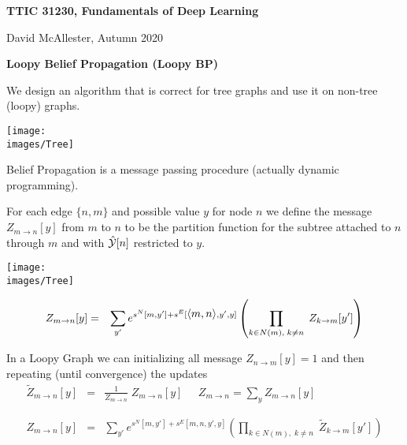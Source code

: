 




{\Huge

  \centerline{\bf TTIC 31230, Fundamentals of Deep Learning}
  \bigskip
  \centerline{David McAllester, Autumn 2020}
  \vfill
  \vfill
  \centerline{\bf Loopy Belief Propagation (Loopy BP)}
\vfill
\vfill
\vfill


We design an algorithm that is correct for tree graphs and use it on non-tree (loopy) graphs.


\centerline{\texttt{[image: \\images/Tree]}}

\vfill
Belief Propagation is a message passing procedure (actually dynamic programming).

\vfill
For each edge $\{n,m\}$ and possible value $y$ for node $n$ we define the message {\color{red} $Z_{m \rightarrow n}[y]$}
from $m$ to $n$ to be  the partition function for the subtree attached to $n$ through $m$ and
with $\hat{\cal Y}[n]$ restricted to $y$.


\centerline{\texttt{[image: \\images/Tree]}}

\vfill
\begin{eqnarray*}
  Z_{m\rightarrow n}[y] & = & \sum_{y'}  e^{s^N[m,y'] + s^E[{\mbox{$\langle m,n\rangle$}},y',y]}
    \left(\prod_{k \in N(m),\;k \not = n}\;Z_{k\rightarrow m}[y']\right)
\end{eqnarray*}


In a Loopy Graph we can initializing all message $Z_{n \rightarrow m}[y] = 1$ and then repeating (until convergence) the updates
\vfill
\begin{eqnarray*}
  \tilde{Z}_{m \rightarrow n}[y] & = & \frac{1}{Z_{m \rightarrow n}}\;Z_{m \rightarrow n}[y] \;\;\;\;\;Z_{m \rightarrow n} = \sum_{y} Z_{m \rightarrow n}[y] \\
  \\
  \\
  Z_{m\rightarrow n}[y] & = & \sum_{y'}  e^{s^N[m,y'] + s^E[m,n,y',y]}
    \left(\prod_{k \in N(m),\;k \not = n}\;\tilde{Z}_{k\rightarrow m}[y']\right)
\end{eqnarray*}


}
